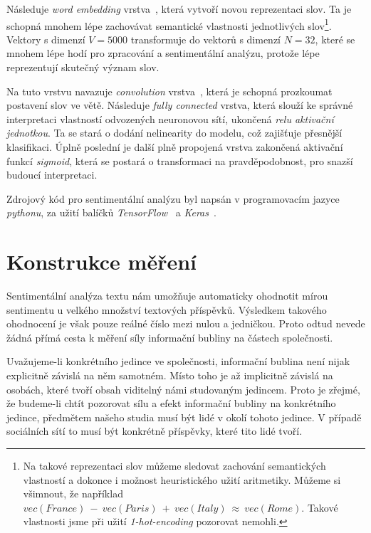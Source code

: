\documentclass[12pt, a4paper]{article}
\numberwithin{equation}{section} 	%
\begin{document}
Následuje \textit{word embedding} vrstva~\cite{WordEmbedding1, WordEmbedding2}, která vytvoří novou reprezentaci slov. Ta je schopná mnohem lépe zachovávat semantické vlastnosti jednotlivých slov\footnote{Na takové reprezentaci slov můžeme sledovat zachování semantických vlastností a dokonce i možnost heuristického užití aritmetiky. Můžeme si všimnout, že například $vec(\textit{France})~-~vec(\textit{Paris})~+~vec(\textit{Italy})~\approx~vec(\textit{Rome})$. Takové vlastnosti jsme při užití \textit{1-hot-encoding} pozorovat nemohli.}. Vektory s dimenzí $V = 5000$ transformuje do vektorů s dimenzí $N = 32$, které se mnohem lépe hodí pro zpracování a sentimentální analýzu, protože lépe reprezentují skutečný význam slov.

Na tuto vrstvu navazuje \textit{convolution} vrstva~\cite{CNN}, která je schopná prozkoumat postavení slov ve větě. Následuje \textit{fully connected} vrstva, která slouží ke správné interpretaci vlastností odvozených neuronovou sítí, ukončená \textit{relu aktivační jednotkou}. Ta se stará o dodání nelinearity do modelu, což zajišťuje přesnější klasifikaci. Úplně poslední je další plně propojená vrstva zakončená aktivační funkcí \textit{sigmoid}, která se postará o transformaci na pravděpodobnost, pro snazší budoucí interpretaci.

Zdrojový kód pro sentimentální analýzu byl napsán v programovacím jazyce \textit{pythonu}, za užití balíčků \textit{TensorFlow}~\cite{TensorFlow} a \textit{Keras}~\cite{keras}.

\newpage
\section{Konstrukce měření}
\noindent Sentimentální analýza textu nám umožňuje automaticky ohodnotit mírou sentimentu u velkého množství textových příspěvků. Výsledkem takového ohodnocení je však pouze reálné číslo mezi nulou a jedničkou. Proto odtud nevede žádná přímá cesta k měření síly informační bubliny na částech společnosti. %

Uvažujeme-li konkrétního jedince ve společnosti, informační bublina není nijak explicitně závislá na něm samotném. Místo toho je až implicitně závislá na osobách, které tvoří obsah viditelný námi studovaným jedincem. Proto je zřejmé, že budeme-li chtít pozorovat sílu a efekt informační bubliny na konkrétního jedince, předmětem našeho studia musí být lidé v okolí tohoto jedince. V případě sociálních sítí to musí být konkrétně příspěvky, které tito lidé tvoří.
\end{document}
